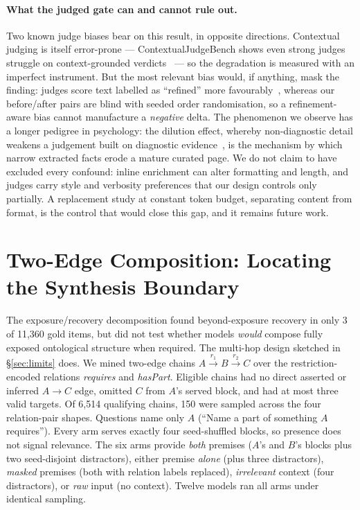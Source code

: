 \documentclass[10pt,twocolumn]{article}
\begin{document}
\paragraph{What the judged gate can and cannot rule out.} Two known judge biases bear on this result, in opposite directions. Contextual judging is itself error-prone --- ContextualJudgeBench shows even strong judges struggle on context-grounded verdicts~\cite{contextualjudgebench2025} --- so the degradation is measured with an imperfect instrument. But the most relevant bias would, if anything, mask the finding: judges score text labelled as ``refined'' more favourably~\cite{calmjudgebias2024}, whereas our before/after pairs are blind with seeded order randomisation, so a refinement-aware bias cannot manufacture a \emph{negative} delta. The phenomenon we observe has a longer pedigree in psychology: the dilution effect, whereby non-diagnostic detail weakens a judgement built on diagnostic evidence~\cite{nisbett1981dilution}, is the mechanism by which narrow extracted facts erode a mature curated page. We do not claim to have excluded every confound: inline enrichment can alter formatting and length, and judges carry style and verbosity preferences that our design controls only partially. A replacement study at constant token budget, separating content from format, is the control that would close this gap, and it remains future work.

\section{Two-Edge Composition: Locating the Synthesis Boundary}\label{sec:composition}
The exposure/recovery decomposition found beyond-exposure recovery in only 3 of 11{,}360
gold items, but did not test whether models \emph{would} compose fully exposed ontological
structure when required. The multi-hop design sketched in \S\ref{sec:limits} does. We mined
two-edge chains $A\!\xrightarrow{r_1}\!B\!\xrightarrow{r_2}\!C$ over the restriction-encoded
relations \emph{requires} and \emph{hasPart}. Eligible chains had no direct asserted or inferred
$A\!\to\!C$ edge, omitted $C$ from $A$'s served block, and had at most three valid targets.
Of 6{,}514 qualifying chains, 150 were sampled across the four relation-pair shapes. Questions
name only $A$ (``Name a part of something $A$ requires''). Every arm serves exactly four
seed-shuffled blocks, so presence does not signal relevance. The six arms provide \emph{both}
premises ($A$'s and $B$'s blocks plus two seed-disjoint distractors), either premise
\emph{alone} (plus three distractors), \emph{masked} premises (both with relation labels
replaced), \emph{irrelevant} context (four distractors), or \emph{raw} input (no context).
Twelve models ran all arms under identical sampling.
\end{document}
